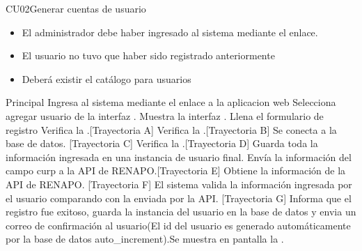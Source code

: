 \begin{UseCase}{CU02}{Generar cuentas de usuario}
{\begin{itemize}
				\item El administrador debe haber ingresado al sistema mediante el 			                 enlace. 
				\item El usuario no tuvo que haber sido registrado anteriormente
				\item Deberá existir el catálogo para usuarios
			\end{itemize}
		}
	\end{UseCase}
	\begin{UCtrayectoria}{Principal}
	\UCpaso[\UCactor] Ingresa al sistema mediante el enlace a la aplicacion web
	 \UCpaso[\UCactor] Selecciona agregar usuario de la interfaz .
	 \UCpaso[\UCsist]Muestra la interfaz .
	  \UCpaso[\UCactor] Llena el formulario de registro
	   \UCpaso[\UCsist] Verifica la  .[Trayectoria A]
	    \UCpaso[\UCsist] Verifica la .[Trayectoria B]
	    \UCpaso[\UCsist] Se conecta a la base de datos. [Trayectoria C]
	    \UCpaso[\UCsist] Verifica la .[Trayectoria D]
	    \UCpaso[\UCsist] Guarda toda la información ingresada en una instancia de usuario final.
	  \UCpaso[\UCsist]Envía la información del campo curp a la API de RENAPO.[Trayectoria E]
	  \UCpaso[\UCsist]Obtiene la información de la API de RENAPO. [Trayectoria F]
	  \UCpaso[\UCsist]El sistema valida la información ingresada por el usuario comparando con la enviada por la API. [Trayectoria G]
	    \UCpaso[\UCsist]Informa que el registro fue exitoso, guarda la instancia del usuario en la base de datos y envia un correo de confirmación al usuario(El id del usuario es generado automáticamente por la base de datos auto\_increment).Se muestra en pantalla la .
	\end{UCtrayectoria}
